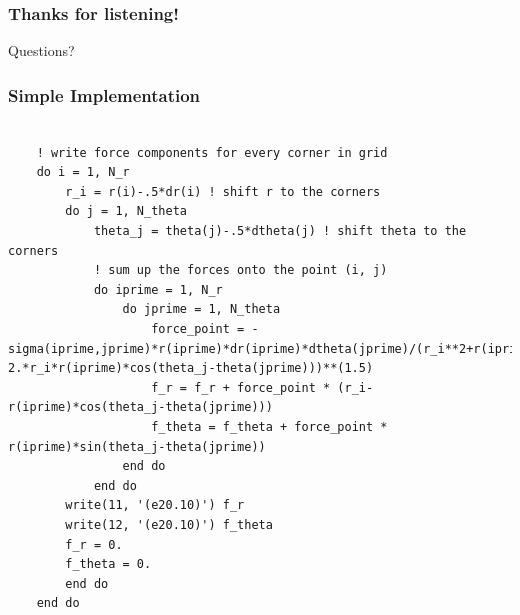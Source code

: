 \documentclass{beamer}
\begin{document}
\begin{frame}
 \frametitle{Thanks for listening!}
 \begin{center}
  Questions?
 \end{center}
\end{frame}
\begin{frame}[fragile]
  \frametitle{Simple Implementation}
      
  \begin{lstlisting}
  
    ! write force components for every corner in grid
    do i = 1, N_r
        r_i = r(i)-.5*dr(i) ! shift r to the corners
        do j = 1, N_theta
            theta_j = theta(j)-.5*dtheta(j) ! shift theta to the corners
            ! sum up the forces onto the point (i, j)
            do iprime = 1, N_r
                do jprime = 1, N_theta
                    force_point = -sigma(iprime,jprime)*r(iprime)*dr(iprime)*dtheta(jprime)/(r_i**2+r(iprime)**2-2.*r_i*r(iprime)*cos(theta_j-theta(jprime)))**(1.5)
                    f_r = f_r + force_point * (r_i-r(iprime)*cos(theta_j-theta(jprime)))
                    f_theta = f_theta + force_point * r(iprime)*sin(theta_j-theta(jprime))
                end do
            end do
        write(11, '(e20.10)') f_r
        write(12, '(e20.10)') f_theta
        f_r = 0.
        f_theta = 0.
        end do
    end do
  \end{lstlisting}
\end{frame}

\end{document}
